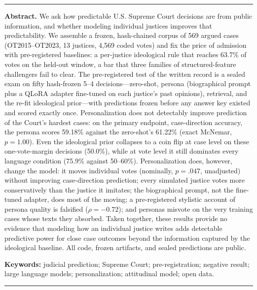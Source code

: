 \documentclass[11pt,a4paper]{article}
\begin{document}
\begin{center}
\rule{0.28\linewidth}{0.6pt}
\end{center}
\noindent\textbf{Abstract.}
We ask how predictable U.S. Supreme Court decisions are from public
information, and whether modeling individual justices improves that
predictability. We assemble a frozen, hash-chained corpus of 569 argued
cases (OT2015--OT2023, 13 justices, 4{,}569 coded votes) and fix the
price of admission with pre-registered baselines: a per-justice
ideological rule that reaches 63.7\% of votes on the held-out window,
a bar that three families of structured-feature challengers fail to
clear. The pre-registered test of the written record is a sealed exam
on fifty hash-frozen 5--4 decisions---zero-shot, persona
(biographical prompt plus a QLoRA adapter fine-tuned on each justice's
past opinions), retrieval, and the re-fit ideological prior---with
predictions frozen before any answer key existed and scored exactly
once. Personalization does not detectably improve prediction of the
Court's hardest cases: on the primary endpoint, case-direction
accuracy, the persona scores 59.18\% against the zero-shot's 61.22\%
(exact McNemar, $p=1.00$). Even the ideological prior collapses to a
coin flip at case level on these one-vote-margin decisions (50.0\%),
while at vote level it still dominates every language condition
(75.9\% against 50--60\%). Personalization does, however, change the model: it moves
individual votes (nominally, $p=.047$, unadjusted) without improving
case-direction prediction; every simulated justice votes more
conservatively than the justice it imitates; the biographical prompt,
not the fine-tuned adapter, does most of the moving; a pre-registered
stylistic account of persona quality is falsified ($\rho=-0.72$); and
personas misvote on the very training cases whose texts they absorbed.
Taken together, these results provide no evidence that modeling how
an individual justice writes adds detectable predictive power for
close case outcomes beyond the information captured by the
ideological baseline. All code, frozen artifacts, and sealed
predictions are public.

\vspace{4pt}
\noindent\textbf{Keywords:} judicial prediction; Supreme Court;
pre-registration; negative result; large language models;
personalization; attitudinal model; open data.

\begin{center}
\rule{0.28\linewidth}{0.6pt}
\end{center}
\vspace{8pt}
\end{document}
